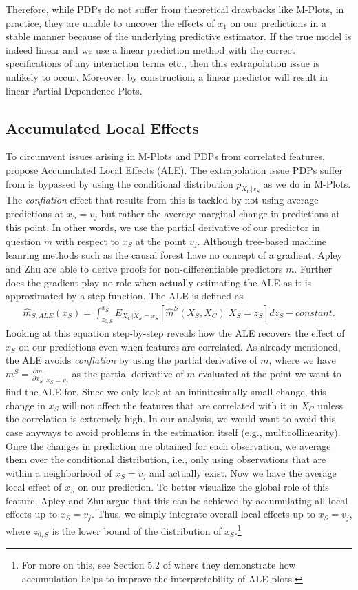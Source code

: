 Therefore, while PDPs do not suffer from theoretical drawbacks like M-Plots, in practice, they are unable to uncover the effects of $x_1$ on our predictions in a stable manner because of the underlying predictive estimator. If the true model is indeed linear and we use a linear prediction method with the correct specifications of any interaction terms etc., then this extrapolation issue is unlikely to occur. Moreover, by construction, a linear predictor will result in linear Partial Dependence Plots.

\subsection{Accumulated Local Effects}
To circumvent issues arising in M-Plots and PDPs from correlated features, \citep{apleyzhu_2020} propose Accumulated Local Effects (ALE). The extrapolation issue PDPs suffer from is bypassed by using the conditional distribution $p_{X_C|x_S}$ as we do in M-Plots. The \textit{conflation} effect that results from this is tackled by not using average predictions at $x_S=v_j$ but rather the average marginal change in predictions at this point. In other words, we use the partial derivative of our predictor in question $m$ with respect to $x_S$ at the point $v_j$. Although tree-based machine leanring methods such as the causal forest have no concept of a gradient, Apley and Zhu are able to derive proofs for non-differentiable predictors $m$. Further does the gradient play no role when actually estimating the ALE as it is approximated by a step-function. The ALE is defined as
\begin{align}
\hat{m}_{S, ALE} (x_S)=\int_{z_{0, S}}^{x_S} E_{X_C|X_S=x_S}[\hat{m}^S(X_S, X_C)|X_S=z_S]dz_S - constant. \label{eq:ale}
\end{align}
Looking at this equation step-by-step reveals how the ALE recovers the effect of $x_S$ on our predictions even when features are correlated. As already mentioned, the ALE avoids \textit{conflation} by using the partial derivative of $m$, where we have $m^S=\frac{\partial m}{\partial x_S}\rvert_{x_S=v_j}$ as the partial derivative of $m$ evaluated at the point we want to find the ALE for. Since we only look at an infinitesimally small change, this change in $x_S$ will not affect the features that are correlated with it in $X_C$ unless the correlation is extremely high. In our analysis, we would want to avoid this case anyways to avoid problems in the estimation itself (e.g., multicollinearity). Once the changes in prediction are obtained for each observation, we average them over the conditional distribution, i.e., only using observations that are within a neighborhood of $x_S=v_j$ and actually exist. Now we have the average local effect of $x_S$ on our prediction. To better visualize the global role of this feature, Apley and Zhu argue that this can be achieved by accumulating all local effects up to $x_S=v_j$. Thus, we simply integrate overall local effects up to $x_S=v_j$, where $z_{0, S}$ is the lower bound of the distribution of $x_S$.\footnote{For more on this, see Section 5.2 of \citep{apleyzhu_2020} where they demonstrate how accumulation helps to improve the interpretability of ALE plots.} \\
